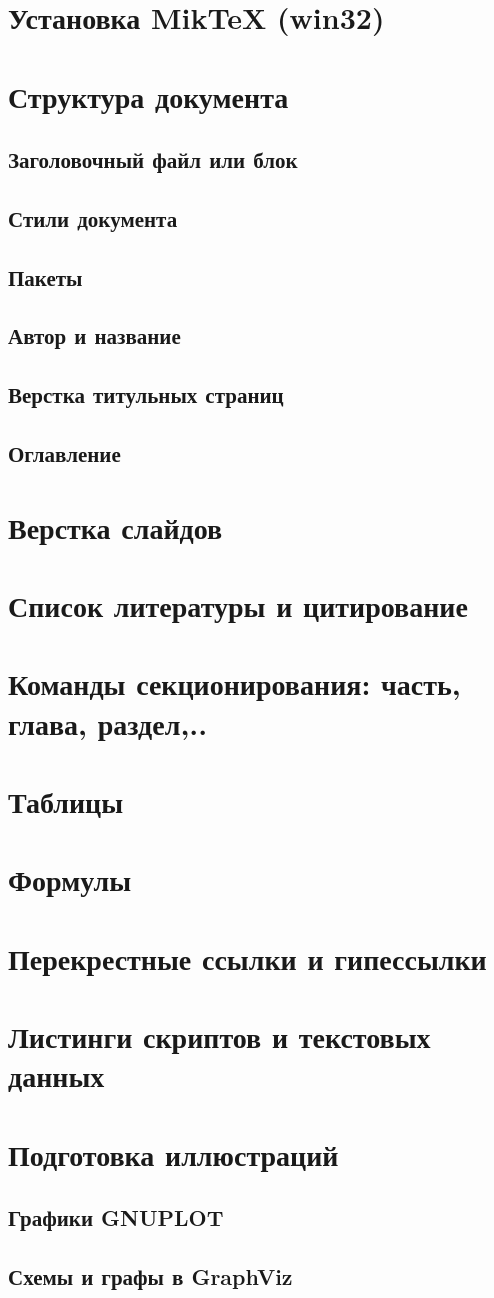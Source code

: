 \section{Установка MikTeX (win32)}
\section{Структура документа}
\subsection{Заголовочный файл или блок}
\subsection{Стили документа}
\subsection{Пакеты}
\subsection{Автор и название}
\subsection{Верстка титульных страниц}
\subsection{Оглавление}
\section{Верстка слайдов}
\section{Список литературы и цитирование}
\section{Команды секционирования: часть, глава, раздел,..}
\section{Таблицы}
\section{Формулы}
\section{Перекрестные ссылки и гипессылки}
\section{Листинги скриптов и текстовых данных}
\section{Подготовка иллюстраций}
\subsection{Графики GNUPLOT}
\subsection{Схемы и графы в GraphViz}


